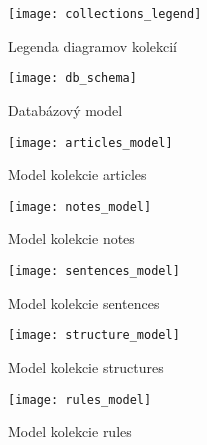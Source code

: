 \begin{figure}[H]
	\begin{center}\texttt{[image: collections\_legend]}\end{center}
	\caption[Legenda diagramov kolekcií]{Legenda diagramov kolekcií}\label{fig:collections_legend}
\end{figure}

\begin{figure}[H]
	\begin{center}\texttt{[image: db\_schema]}\end{center}
	\caption[Databázový model]{Databázový model}
\end{figure}

\begin{figure}[H]
	\begin{center}\texttt{[image: articles\_model]}\end{center}
	\caption[Model kolekcie articles]{Model kolekcie articles}
\end{figure}

\begin{figure}[H]
	\begin{center}\texttt{[image: notes\_model]}\end{center}
	\caption[Model kolekcie notes]{Model kolekcie notes}\label{fig:notes_collection_model}
\end{figure}

\begin{figure}[H]
	\begin{center}\texttt{[image: sentences\_model]}\end{center}
	\caption[Model kolekcie sentences]{Model kolekcie sentences}\label{fig:sentences_collection_model}
\end{figure}

\begin{figure}[H]
	\begin{center}\texttt{[image: structure\_model]}\end{center}
	\caption[Model kolekcie structures]{Model kolekcie structures}\label{fig:structures_collection_model}
\end{figure}

\begin{figure}[H]
	\begin{center}\texttt{[image: rules\_model]}\end{center}
	\caption[Model kolekcie rules]{Model kolekcie rules}\label{fig:rules_collection_model}
\end{figure}

